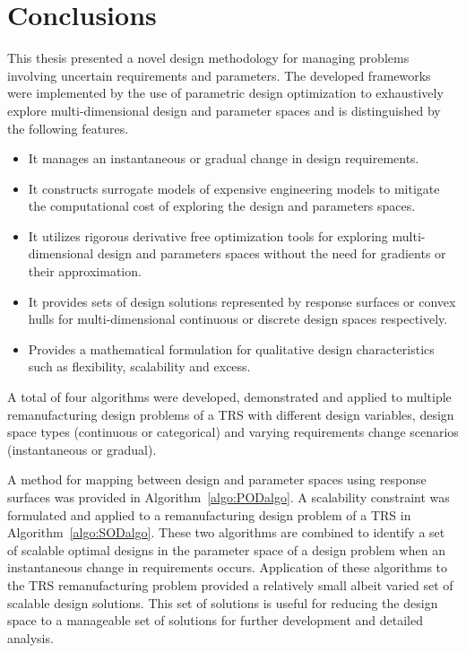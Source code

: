 \chapter{Conclusions}
\label{ch:conclusion}

This thesis presented a novel design methodology for managing problems involving uncertain requirements and parameters. The developed frameworks were implemented by the use of parametric design optimization to exhaustively explore multi-dimensional design and parameter spaces and is distinguished by the following features.

\begin{itemize}
    \item It manages an instantaneous or gradual change in design requirements.
    \item It constructs surrogate models of expensive engineering models to mitigate the computational cost of exploring the design and parameters spaces.
    \item It utilizes rigorous derivative free optimization tools for exploring multi-dimensional design and parameters spaces without the need for gradients or their approximation.
    \item It provides sets of design solutions represented by response surfaces or convex hulls for multi-dimensional continuous or discrete design spaces respectively.
    \item Provides a mathematical formulation for qualitative design characteristics such as flexibility, scalability and excess.
\end{itemize}

A total of four algorithms were developed, demonstrated and applied to multiple remanufacturing design problems of a \ac{TRS} with different design variables, design space types (continuous or categorical) and varying requirements change scenarios (instantaneous or gradual). 

A method for mapping between design and parameter spaces using response surfaces was provided in Algorithm~\ref{algo:PODalgo}. A scalability constraint was formulated and applied to a remanufacturing design problem of a \ac{TRS} in Algorithm~\ref{algo:SODalgo}. These two algorithms are combined to identify a set of scalable optimal designs in the parameter space of a design problem when an instantaneous change in requirements occurs. Application of these algorithms to the \ac{TRS} remanufacturing problem provided a relatively small albeit varied set of scalable design solutions. This set of solutions is useful for reducing the design space to a manageable set of solutions for further development and detailed analysis.

